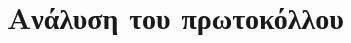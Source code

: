 \chapter{Ανάλυση του πρωτοκόλλου}

\begin{section}{}
\bigskip

\end{section}

\begin{section}{}
\bigskip

\end{section}
